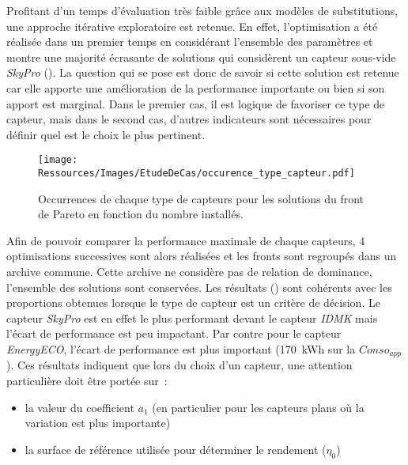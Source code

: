 Profitant d’un temps d’évaluation très faible grâce aux modèles de substitutions,
une approche itérative exploratoire est retenue.
En effet, l’optimisation a été réalisée dans un premier
temps en considérant l’ensemble des paramètres et montre une majorité écrasante de
solutions qui considèrent un capteur sous-vide \textit{SkyPro} ().
La question qui se pose est donc de savoir si cette solution est retenue car elle
apporte une amélioration de la performance importante ou bien si son apport est
marginal. Dans le premier cas, il est logique de favoriser ce type de capteur,
mais dans le second cas, d’autres indicateurs sont nécessaires pour définir quel
est le choix le plus pertinent.

\begin{figure}
    \centering
    \texttt{[image: Ressources/Images/EtudeDeCas/occurence\_type\_capteur.pdf]}
    \caption[Occurrences de chaque type de capteurs pour les solutions du front de Pareto]
             {Occurrences de chaque type de capteurs pour les solutions du front de Pareto
              en fonction du nombre installés.}
    \label{fig:occurence_type_capteur}
\end{figure}

Afin de pouvoir comparer la performance maximale de chaque capteurs, \num{4} optimisations
successives sont alors réalisées et les fronts sont regroupés dans un archive commune.
Cette archive ne considère pas de relation de dominance, l’ensemble des solutions sont
conservées. Les résultats () sont cohérents avec les
proportions obtenues lorsque le type de capteur est un critère de décision. Le capteur
\textit{SkyPro} est en effet le plus performant devant le capteur \textit{IDMK} mais
l’écart de performance est peu impactant. Par contre pour le capteur \textit{EnergyECO},
l’écart de performance est plus important (\SI{170}{kWh} sur la $Conso_{app}$). Ces résultats
indiquent que lors du choix d’un capteur, une attention particulière doit être portée sur~:
\begin{itemize}
  \item la valeur du coefficient $a_{1}$ (en particulier pour les capteurs plans où la variation est plus importante)
  \item la surface de référence utilisée pour déterminer le rendement ($\eta_{0}$)
\end{itemize}

